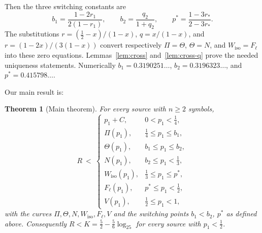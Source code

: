 \documentclass[journal]{IEEEtran}
\newtheorem{theorem}{Theorem}
\theoremstyle{definition}
\newcommand{\lgg}{\log_2}
\newcommand{\CC}{C}
\begin{document}
Then the three switching constants are
\[
  b_1=\frac{1-2r_1}{2(1-r_1)},\qquad
  b_2=\frac{q_2}{1+q_2},\qquad
  p^*=\frac{1-3r_*}{2-3r_*}.
\]
The substitutions
$r=(\tfrac12-x)/(1-x)$, $q=x/(1-x)$, and
$r=(1-2x)/(3(1-x))$ convert respectively $\Pi=\Theta$, $\Theta=N$, and
$W_{\mathrm{iso}}=F_\ell$ into these zero equations.
Lemmas~\ref{lem:cross} and~\ref{lem:cross-q} prove the needed uniqueness
statements. Numerically
$b_1=0.3190251\ldots$, $b_2=0.3196323\ldots$, and
$p^*=0.415798\ldots$.

Our main result is:

\begin{theorem}[Main theorem]\label{thm:main}
For every source with $n\ge2$ symbols,
\[
   \boxed{\ \ R\ <\ \begin{cases}
   p_1+\CC, & 0<p_1<\tfrac14,\\[2pt]
   \Pi(p_1), & \tfrac14\le p_1\le b_1,\\[2pt]
   \Theta(p_1), & b_1\le p_1\le b_2,\\[2pt]
   N(p_1), & b_2\le p_1<\tfrac13,\\[2pt]
   W_{\mathrm{iso}}(p_1), & \tfrac13\le p_1\le p^*,\\[2pt]
   F_\ell(p_1), & p^*\le p_1<\tfrac12,\\[2pt]
   V(p_1), & \tfrac12\le p_1<1,
   \end{cases}\ \ }
\]
with the curves $\Pi,\Theta,N,W_{\mathrm{iso}},F_\ell,V$ and the switching
points $b_1<b_2$, $p^*$ as defined above.
Consequently $R<K=\tfrac52-\tfrac56\lgg5$ for every source with
$p_1<\tfrac12$.
\end{theorem}
\end{document}
